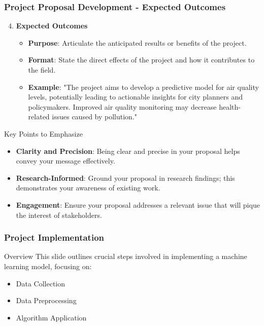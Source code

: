 \documentclass[aspectratio=169]{beamer}
\begin{document}
\begin{frame}[fragile]
    \frametitle{Project Proposal Development - Expected Outcomes}
    \begin{enumerate}
        \setcounter{enumi}{3}
        \item \textbf{Expected Outcomes}
            \begin{itemize}
                \item \textbf{Purpose}: Articulate the anticipated results or benefits of the project.
                \item \textbf{Format}: State the direct effects of the project and how it contributes to the field.
                \item \textbf{Example}: "The project aims to develop a predictive model for air quality levels, potentially leading to actionable insights for city planners and policymakers. Improved air quality monitoring may decrease health-related issues caused by pollution."
            \end{itemize}
    \end{enumerate}
    
    \begin{block}{Key Points to Emphasize}
        \begin{itemize}
            \item \textbf{Clarity and Precision}: Being clear and precise in your proposal helps convey your message effectively.
            \item \textbf{Research-Informed}: Ground your proposal in research findings; this demonstrates your awareness of existing work.
            \item \textbf{Engagement}: Ensure your proposal addresses a relevant issue that will pique the interest of stakeholders.
        \end{itemize}
    \end{block}
\end{frame}

\begin{frame}
    \frametitle{Project Implementation}
    \begin{block}{Overview}
        This slide outlines crucial steps involved in implementing a machine learning model, focusing on:
        \begin{itemize}
            \item Data Collection
            \item Data Preprocessing
            \item Algorithm Application
        \end{itemize}
    \end{block}
\end{frame}
\end{document}
